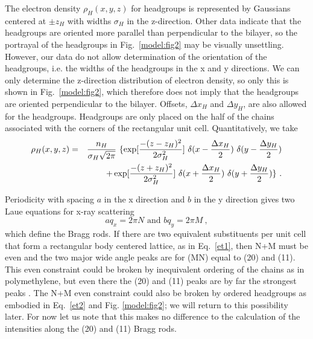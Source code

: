 The electron density ${\rho}_{H}(x,y,z)$ for headgroups is represented by
Gaussians centered at $\pm z_{H}$ with widths ${\sigma}_{H}$ in the z-direction.
Other data \cite{Buldt79} indicate that the headgroups are oriented more parallel than
perpendicular to the bilayer, so the portrayal of the headgroups in Fig.\ \ref{model:fig2}
may be visually unsettling.  However, our data do not allow determination of the orientation
of the headgroups, i.e. the widths of the headgroups in the x and y directions.
We can only determine the z-direction distribution of electron density, so
only this is shown in Fig.\ \ref{model:fig2}, which therefore does not imply that the headgroups
are oriented perpendicular to the bilayer. 
Offsets, $\Delta x_{H}$ and $\Delta y_{H}$, are also allowed for the headgroups.
Headgroups are only placed on the half of the chains associated with the
corners of the rectangular unit cell.  Quantitatively, we take
\begin{eqnarray}
\label{et2}
{\rho}_{H} (x,y,z) = &&{n_{H} \over {\sigma}_{H} \sqrt{2 \pi}}~\{\exp[{- (z - z_{H})^{2} 
\over 2 {\sigma}_{H}^{2}}]~\delta (x - {\Delta x_{H} \over 2})~\delta (y - {\Delta y_{H} 
\over 2}) \nonumber \\ 
&& + \exp[{-(z + z_{H})^{2} \over 2 {\sigma}_{H}^{2}}]~\delta (x + {\Delta x_{H} 
\over 2})~\delta (y + {\Delta y_{H} \over 2})\}~.
\end{eqnarray}

Periodicity with spacing $a$ in the x direction and $b$ in the y direction
gives two Laue equations for x-ray scattering
\begin{equation}
\label{et3}
a q_{x} = 2 \pi N \mbox{ and } b q_{y} = 2 \pi M~,
\end{equation}
which define the Bragg rods. If there are two equivalent substituents per unit 
cell that form a rectangular body centered lattice, as in Eq.\ \ref{et1},
then N+M must be even and the two major wide angle peaks
are for (MN) equal to (20) and (11).  This even constraint could be
broken by inequivalent ordering of the chains as in polymethylene, but
even there the (20) and (11) peaks are by far the strongest peaks \cite{Bunn}.  
The N+M even constraint could also be broken by ordered headgroups as embodied
in Eq.\ \ref{et2} and Fig. \ref{model:fig2}; we will return to this 
possibility later.  For
now let us note that this makes no difference to the calculation of the
intensities along the (20) and (11) Bragg rods.


